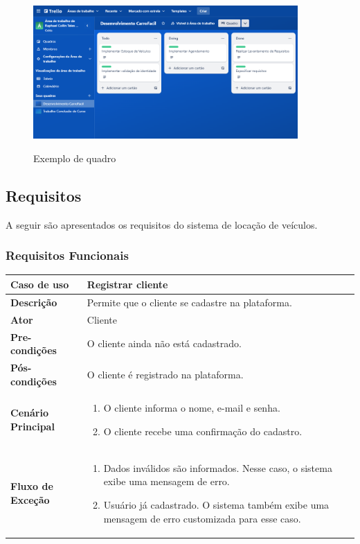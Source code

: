 \begin{figure}[ht!]
    \centering
    \caption{Exemplo de quadro }
    \includegraphics[width=0.9\textwidth]{media/kanban.png}
    \label{fig:kanban}
\end{figure}

\subsection{Requisitos}
A seguir são apresentados os requisitos do sistema de locação de veículos.
\subsubsection{Requisitos Funcionais}

\begin{quadro}[H]
    \centering
    \caption{Registrar cliente}
    \label{quad:registrar_cliente}
    \begin{tabular}{|p{1.2in}|p{3.5in}|}
    \hline
    
    \textbf{Caso de uso} & Registrar cliente \\ \hline
    \textbf{Descrição} & Permite que o cliente se cadastre na plataforma. \\ \hline
    \textbf{Ator} & Cliente \\ \hline
    \textbf{Pre-condições} & O cliente ainda não está cadastrado. \\ \hline
    \textbf{Pós-condições} & O cliente é registrado na plataforma.\\ \hline
    \textbf{Cenário Principal} & \begin{enumerate}
        \item O cliente informa o nome, e-mail e senha.
        \item O cliente recebe uma confirmação do cadastro.
    \end{enumerate}  \\ \hline
    \textbf{Fluxo de Exceção} & \begin{enumerate}
        \item Dados inválidos são informados. Nesse caso, o sistema exibe uma mensagem de erro.
        \item Usuário já cadastrado. O sistema também exibe uma mensagem de erro customizada para esse caso.
    \end{enumerate}  \\ \hline
    \end{tabular}
\end{quadro}

